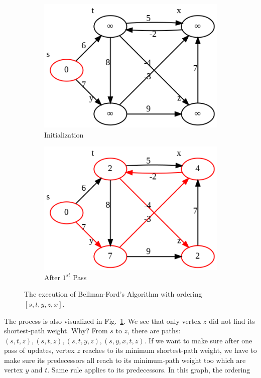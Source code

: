 \documentclass[../main.tex]{subfiles}
\begin{document}
\begin{figure}[!ht]
    \centering
    \begin{subfigure}{.45\textwidth}
    \includegraphics[width=0.99\columnwidth]{fig/bellman_ford_0_tp.png}
    \caption{Initialization}
    \end{subfigure}
    \begin{subfigure}{.45\textwidth}
    \includegraphics[width=0.99\columnwidth]{fig/bellman_ford_1_tp.png}
    \caption{After $1^{st}$ Pass}
    \end{subfigure}
    \caption{The execution of Bellman-Ford's Algorithm with ordering $[s, t, y, z, x]$.}
    \label{fig:bellman_ford_3}
\end{figure}
The process is also visualized in Fig.~\ref{fig:bellman_ford_3}.
We see that only vertex $z$ did not find its shortest-path weight. Why? From $s$ to $z$, there are paths: $(s, t, z), (s, t, z), (s, t, y, z), (s, y, x, t, z)$. If we want to make sure after one pass of updates, vertex $z$ reaches to its minimum shortest-path weight, we have to make sure its predecessors all reach to its minimum-path weight too which are vertex $y$ and $t$. Same rule applies to its predecessors. In this graph, the ordering 
\end{document}
